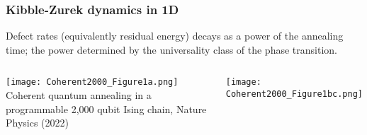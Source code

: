 \documentclass[aspectratio=169,final,11pt,forpublic]{beamer} %
\begin{document}
\begin{frame}\frametitle{\bf Kibble-Zurek dynamics in 1D}
  Defect rates (equivalently residual energy) decays as a power of the annealing time; the power determined by the universality class of the phase transition.
  \begin{columns}
    \begin{center}
      \texttt{[image: Coherent2000\_Figure1a.png]}\\
      {\small Coherent quantum annealing in
      a programmable 2,000 qubit Ising chain, Nature
      Physics (2022)}
    \end{center}
    \begin{center}
      \texttt{[image: Coherent2000\_Figure1bc.png]}\\
    \end{center}
\end{columns}
\end{frame}

        
%
%  
%
%        
\end{document}
